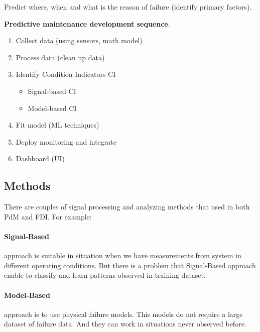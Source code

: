 Predict where, when and what is the reason of failure (identify primary
factors).


\textbf{Predictive maintenance development sequence}:
\begin{enumerate}
    \item{Collect data (using sensors, math model)}
    \item{Process data (clean up data)}
    \item{Identify Condition Indicators CI}
        \begin{itemize}
            \item{Signal-based CI}
            \item{Model-based CI}
        \end{itemize}
    \item{Fit model (ML techniques)}
    \item{Deploy monitoring and integrate}
    \item{Dashboard (UI)}
\end{enumerate}


\subsection{Methods}
There are couples of signal processing and analyzing methods that used in
both PdM and FDI. For example:

\paragraph{Signal-Based} approach is suitable in situation when we have
measurements from system in different operating conditions. 
But there is a problem that Signal-Based approach enable to classify and
learn patterns observed in training dataset. 


\paragraph{Model-Based} approach is to use physical failure models. This
models do not require a large dataset of failure data. And they can work in
situations never observed before. 


